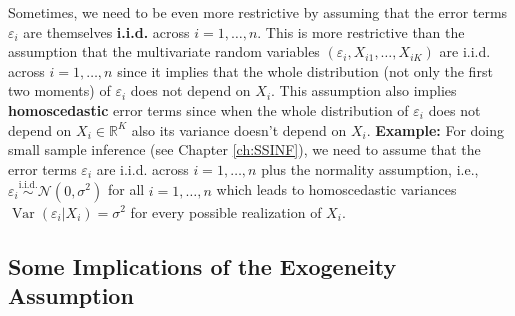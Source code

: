 \documentclass[
  14pt,
]{memoir}
\DeclareMathOperator{\V}{\operatorname{Var}}
\begin{document}
\bigskip

Sometimes, we need to be even more restrictive by assuming that the error terms \(\varepsilon_i\)
are themselves \textbf{i.i.d.} across \(i=1,\dots,n\). This is more restrictive than the assumption that the
multivariate random variables \((\varepsilon_i,X_{i1},\dots,X_{iK})\) are i.i.d. across \(i=1,\dots,n\)
since it implies that the whole distribution (not only the first two moments) of \(\varepsilon_i\)
does not depend on \(X_i\). This assumption also implies \textbf{homoscedastic} error terms since when
the whole distribution of \(\varepsilon_i\) does not depend on \(X_i\in\mathbb{R}^K\) also its variance
doesn't depend on \(X_i\). \textbf{Example:} For doing small sample inference (see Chapter \ref{ch:SSINF}), we need to assume that the error terms \(\varepsilon_i\) are i.i.d. across \(i=1,\dots,n\) plus the normality assumption, i.e., \(\varepsilon_i\stackrel{\textrm{i.i.d.}}{\sim}{\mathcal N} (0, \sigma^2)\) for all \(i=1,\dots,n\) which leads to homoscedastic variances \(\V(\varepsilon_i|X_i)=\sigma^2\) for every possible realization of \(X_i\).

\hypertarget{some-implications-of-the-exogeneity-assumption}{%
\subsection{Some Implications of the Exogeneity Assumption}\label{some-implications-of-the-exogeneity-assumption}}
\end{document}
